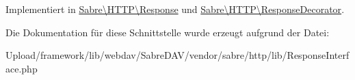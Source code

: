 Implementiert in \mbox{\hyperlink{class_sabre_1_1_h_t_t_p_1_1_response_aa2f393e4e475f4b6019b7add7a99be86}{Sabre\textbackslash{}\+H\+T\+T\+P\textbackslash{}\+Response}} und \mbox{\hyperlink{class_sabre_1_1_h_t_t_p_1_1_response_decorator_a0b3f39d2f9af949ab2a1cd63516f2934}{Sabre\textbackslash{}\+H\+T\+T\+P\textbackslash{}\+Response\+Decorator}}.



Die Dokumentation für diese Schnittstelle wurde erzeugt aufgrund der Datei\+:\begin{DoxyCompactItemize}
\item 
Upload/framework/lib/webdav/\+Sabre\+D\+A\+V/vendor/sabre/http/lib/Response\+Interface.\+php\end{DoxyCompactItemize}
